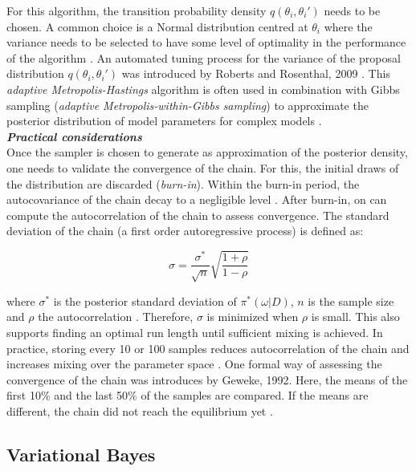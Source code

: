 For this algorithm, the transition probability density $q(\theta_i,\theta_i')$ needs to be chosen. A common choice is a Normal distribution centred at $\theta_i$ where the variance needs to be selected to have some level of optimality in the performance of the algorithm \citep{Roberts2001}. An automated tuning process for the variance of the proposal distribution $q(\theta_i,\theta_i')$ was introduced by Roberts and Rosenthal, 2009 \citep{Roberts2009}. This \emph{adaptive Metropolis-Hastings} algorithm is often used in combination with Gibbs sampling (\emph{adaptive Metropolis-within-Gibbs sampling}) to approximate the posterior distribution of model parameters for complex models \citep{Roberts2009}.\\

\textbf{\textit{Practical considerations}}\\

Once the sampler is chosen to generate as approximation of the posterior density, one needs to validate the convergence of the chain. For this, the initial draws of the distribution are discarded (\emph{burn-in}). Within the burn-in period, the autocovariance of the chain decay to a negligible level \citep{Greyer1992}. After burn-in, on can compute the autocorrelation of the chain to assess convergence. The standard deviation of the chain (a first order autoregressive process) is defined as:

\begin{equation}
\sigma=\frac{\sigma^*}{\sqrt{n}}\sqrt{\frac{1+\rho}{1-\rho}}
\end{equation}

where $\sigma^*$ is the posterior standard deviation of $\pi^*(\omega|D)$, $n$ is the sample size and $\rho$ the autocorrelation \citep{Tierney1991}. Therefore, $\sigma$ is minimized when $\rho$ is small. This also supports finding an optimal run length until sufficient mixing is achieved. In practice, storing every 10 or 100 samples reduces autocorrelation of the chain and increases mixing over the parameter space \citep{Greyer1992}. One formal way of assessing the convergence of the chain was introduces by Geweke, 1992. Here, the means of the first 10\% and the last 50\% of the samples are compared. If the means are different, the chain did not reach the equilibrium yet \citep{Geweke1992}.

\subsection{Variational Bayes}

